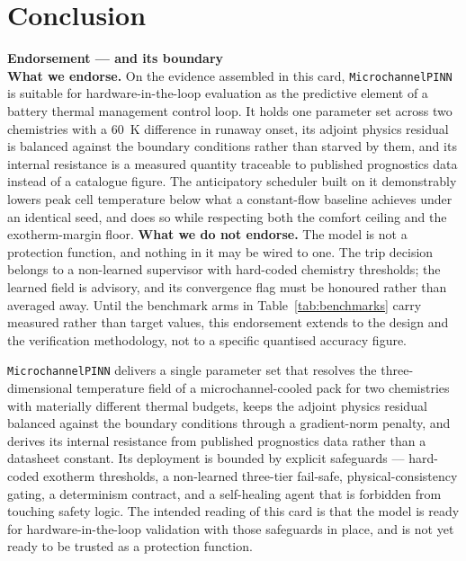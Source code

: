 \documentclass[journal,10pt,compsoc,onecolumn]{IEEEtran}
\newcommand{\hlbox}[2]{%
  \par\vspace{5pt}\noindent
  \colorbox{panegray}{\parbox{\dimexpr\linewidth-2\fboxsep}{%
    {\color{accentblue}\bfseries #1}\\[2pt]\small #2}}\par\vspace{5pt}}
\begin{document}
\section{Conclusion}

\hlbox{Endorsement --- and its boundary}{%
\textbf{What we endorse.} On the evidence assembled in this card,
\texttt{MicrochannelPINN} is suitable for hardware-in-the-loop evaluation as the
predictive element of a battery thermal management control loop. It holds one
parameter set across two chemistries with a \SI{60}{\kelvin} difference in
runaway onset, its adjoint physics residual is balanced against the boundary
conditions rather than starved by them, and its internal resistance is a measured
quantity traceable to published prognostics data instead of a catalogue figure.
The anticipatory scheduler built on it demonstrably lowers peak cell temperature
below what a constant-flow baseline achieves under an identical seed, and does so
while respecting both the comfort ceiling and the exotherm-margin floor.
\textbf{What we do not endorse.} The model is not a protection function, and
nothing in it may be wired to one. The trip decision belongs to a non-learned
supervisor with hard-coded chemistry thresholds; the learned field is advisory,
and its convergence flag must be honoured rather than averaged away. Until the
benchmark arms in Table~\ref{tab:benchmarks} carry measured rather than target
values, this endorsement extends to the design and the verification methodology,
not to a specific quantised accuracy figure.}

\noindent
\texttt{MicrochannelPINN} delivers a single parameter set that resolves the
three-dimensional temperature field of a microchannel-cooled pack for two
chemistries with materially different thermal budgets, keeps the adjoint physics
residual balanced against the boundary conditions through a gradient-norm
penalty, and derives its internal resistance from published prognostics data
rather than a datasheet constant. Its deployment is bounded by explicit
safeguards --- hard-coded exotherm thresholds, a non-learned three-tier
fail-safe, physical-consistency gating, a determinism contract, and a
self-healing agent that is forbidden from touching safety logic. The intended
reading of this card is that the model is ready for hardware-in-the-loop
validation with those safeguards in place, and is not yet ready to be trusted
as a protection function.
\end{document}
